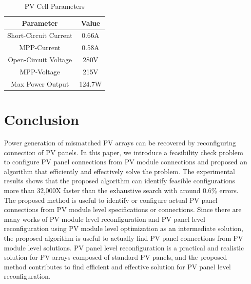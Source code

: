 \documentclass[conference]{pvsctran}
\begin{document}
\begin{table}[t]
\caption{PV Cell Parameters}
\begin{center}
\begin{tabular}{c|c}
\hline \hline
Parameter             & Value  \\ \hline
Short-Circuit Current & 0.66A  \\
MPP-Current           & 0.58A  \\
Open-Circuit Voltage  & 280V   \\
MPP-Voltage           & 215V  \\
Max Power Output      & 124.7W 
\end{tabular}
\end{center}
\label{PV_cell_par}
\end{table}

\section{Conclusion}

Power generation of mismatched PV arrays can be recovered by reconfiguring connection of PV panels.
In this paper, we introduce a feasibility check problem to configure PV panel connections from PV module connections and proposed an algorithm that efficiently and effectively solve the problem. 
The experimental results shows that the proposed algorithm can identify feasible configurations more than 32,000X faster than the exhaustive search with around 0.6\% errors. 
The proposed method is useful to identify or configure actual PV panel connections from PV module level specifications or connections. 
Since there are many works of PV module level reconfiguration and PV panel level reconfiguration using PV module level optimization as an intermediate solution, the proposed algorithm is useful to actually find PV panel connections from PV module level solutions.
PV panel level reconfiguration is a practical and realistic solution for PV arrays composed of standard PV panels, 
and the proposed method contributes to find efficient and effective solution for PV panel level reconfiguration.


\end{document}
